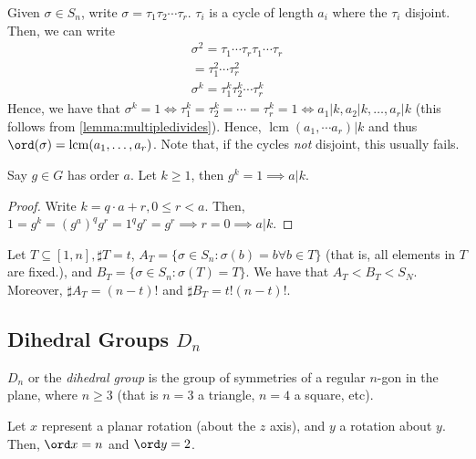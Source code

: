 \documentclass[12pt,oneside]{article}
\DeclareMathOperator*{\lcm}{lcm}
\begin{document}
\begin{example}
  Given $\sigma \in S_n$, write $\sigma = \tau_1 \tau_2 \cdots \tau_r$. $\tau_i$ is a cycle of length $a_i$ where the $\tau_i$ disjoint. Then, we can write \begin{align*}
    \sigma^2 = \tau_1 \cdots \tau_r \tau_1 \cdots \tau_r\\
    = \tau_1^2 \cdots \tau_r^2\\
    \sigma^k = \tau_1^k\tau_2^k \cdots \tau_r^k
  \end{align*}
  Hence, we have that $\sigma^k = 1 \iff \tau_1^k = \tau_2^k = \cdots = \tau_r^k = 1 \iff a_1 | k, a_2 | k, \dots, a_r | k$ (this follows from \cref{lemma:multipledivides}). Hence, $\lcm (a_1, \cdots a_r) | k$ and thus $\ord (\sigma) = \lcm(a_1, \dots, a_r)$. Note that, if the cycles \emph{not} disjoint, this usually fails.
\end{example}

\begin{lemma}\label{lemma:multipledivides}
Say $g \in G$ has order $a$. Let $k \geq 1$, then $g^k = 1 \implies a | k$.
\end{lemma}

\begin{proof}
  Write $k = q \cdot a + r, 0 \leq r < a$. Then, $1 = g^k = (g^a)^q g^r = 1^q g^r = g^r \implies r = 0 \implies a | k$.
\end{proof}

\begin{example}[Subgroups of $S_n$]
  Let $T \subseteq [1, n], \sharp T = t$, $A_T = \{\sigma \in S_n : \sigma(b) = b \forall b \in T\}$ (that is, all elements in $T$ are fixed.), and $B_T = \{\sigma \in S_n : \sigma (T) = T\}$. We have that $A_T < B_T < S_N$. Moreover, $\sharp A_T = (n-t)!$ and $\sharp B_T = t! (n-t)!$.
\end{example}

\subsection{\texorpdfstring{Dihedral Groups $D_n$}{Dihedral Groups}}


\begin{definition}[$D_n$]
  $D_n$ or the \emph{dihedral group} is the group of symmetries of a regular $n$-gon in the plane, where $n \geq 3$ (that is $n = 3$ a triangle, $n=4$ a square, etc).

  Let $x$ represent a planar rotation (about the $z$ axis), and $y$ a rotation about $y$. Then, $\ord x = n$ and $\ord y = 2$.
\end{definition}
\end{document}
